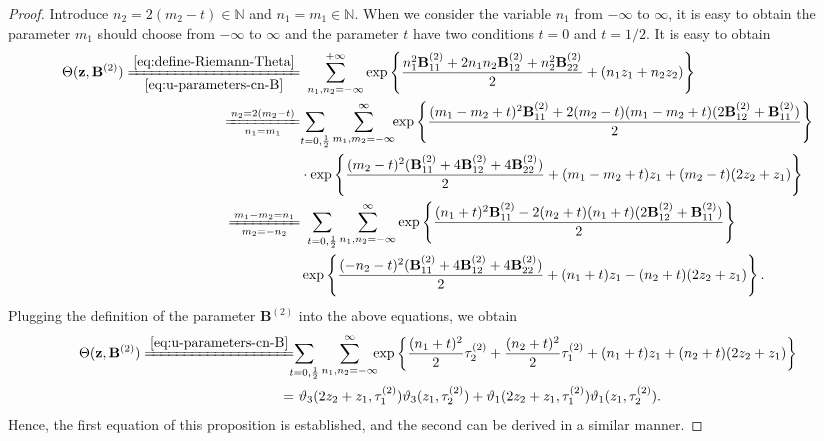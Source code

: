 \documentclass[11pt,reqno]{amsart}
\numberwithin{equation}{section}
\begin{document}
\begin{proof}
	Introduce $n_2=2(m_2-t) \in \mathbb{N}$ and $n_1=m_1 \in \mathbb{N}$. 
	When we consider the variable $n_1$ from $-\infty$ to $\infty$,
	it is easy to obtain the parameter $m_1$ should choose from $-\infty$ to $\infty$ and the parameter $t$ have two conditions $t=0$ and $t=1/2$.
	It is easy to obtain
	\begin{equation}\nonumber
		\begin{split}
			\Theta(\mathbf{z}, \mathbf{B}^{(2)})
			\xlongequal[\eqref{eq:u-parameters-cn-B}]{\eqref{eq:define-Riemann-Theta}}&\  \sum_{n_1,n_2=-\infty}^{+\infty}\exp\left\{ \frac{n_1^2\mathbf{B}^{(2)}_{11}+2n_1n_2 \mathbf{B}^{(2)}_{12}+n_2^2\mathbf{B}^{(2)}_{22}}{2} +(n_1z_1+n_2z_2)\right\}\\
			\xlongequal[n_1=m_1]{n_2=2(m_2-t)}
			&\  \!\!\! \sum_{t=0,\frac{1}{2}}\sum_{m_1,m_2=-\infty}^{\infty}\!\!\exp\left\{  \frac{(m_1-m_2+t)^2\mathbf{B}^{(2)}_{11}+2(m_2-t)(m_1-m_2+t)( 2\mathbf{B}^{(2)}_{12}+ \mathbf{B}^{(2)}_{11})}{2} \right\}\\
			&\cdot \exp\left\{\frac{(m_2-t)^2(\mathbf{B}^{(2)}_{11}+4 \mathbf{B}^{(2)}_{12}+4\mathbf{B}^{(2)}_{22})}{2}+(m_1-m_2+t)z_1+(m_2-t)(2z_2+z_1) \right\}\\
			\xlongequal[m_2=-n_2]{m_1-m_2=n_1}&\ \sum_{t=0,\frac{1}{2}}\sum_{n_1,n_2=-\infty}^{\infty}\exp\left\{ \frac{(n_1+t)^2\mathbf{B}^{(2)}_{11}-2(n_2+t)(n_1+t)( 2\mathbf{B}^{(2)}_{12}+ \mathbf{B}^{(2)}_{11})}{2} \right\}\\
			&\exp\left\{ \frac{(-n_2-t)^2(\mathbf{B}^{(2)}_{11}+4 \mathbf{B}^{(2)}_{12}+4\mathbf{B}^{(2)}_{22})}{2}+(n_1+t)z_1-(n_2+t)(2z_2+z_1)\right\}.
		\end{split}
	\end{equation}
	Plugging the definition of the parameter $ \mathbf{B}^{(2)}$ into the above equations, we obtain 
	\begin{equation}\nonumber
		\begin{split}
			\Theta(\mathbf{z}, \mathbf{B}^{(2)})
			\xlongequal{\eqref{eq:u-parameters-cn-B}}& \!\!\! \sum_{t=0,\frac{1}{2}} \sum_{n_1,n_2=-\infty}^{\infty} \!\!\! \exp\left\{ \frac{(n_1+t)^2}{2} \tau^{(2)}_2+\frac{(n_2+t)^2}{2} \tau^{(2)}_1+(n_1+t)z_1+(n_2+t)(2z_2+z_1)\right\}\\
			=&\ \vartheta_3(2z_2+z_1, \tau^{(2)}_1)\vartheta_3(z_1, \tau^{(2)}_2)+\vartheta_1(2z_2+z_1, \tau^{(2)}_1)\vartheta_1(z_1, \tau^{(2)}_2).
		\end{split}
	\end{equation}
	Hence, the first equation of this proposition is established, and the second can be derived in a similar manner.
\end{proof}
\end{document}
